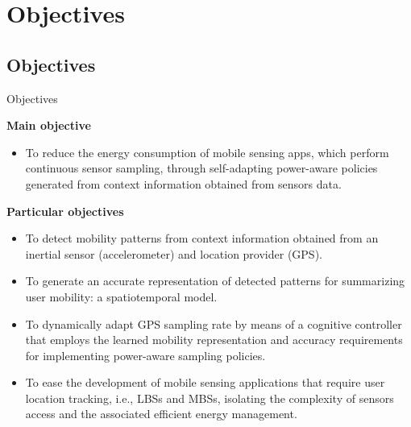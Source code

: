 \section{Objectives}
\subsection{Objectives}
\begin{frame}{Objectives}
\small
\begin{block}{\small \textbf{Main objective}}
\begin{itemize}
  \item To reduce the energy consumption of mobile sensing apps, which perform continuous sensor sampling, through self-adapting power-aware policies generated from context information obtained from sensors data.
\end{itemize}
\end{block}

\begin{block}{\small \textbf{Particular objectives}}
\begin{itemize}
  \item To detect mobility patterns from context information obtained from an inertial sensor (accelerometer) and location provider (GPS).
  \item To generate an accurate representation of detected patterns for summarizing user mobility: a spatiotemporal model.
  \item To dynamically adapt GPS sampling rate by means of a cognitive controller that employs the learned mobility representation and accuracy requirements for implementing power-aware sampling policies.
  \item To ease the development of mobile sensing applications that require user location tracking, i.e., LBSs and MBSs, isolating the complexity of sensors access and the associated efficient energy management.
\end{itemize}
\end{block}
\end{frame}

